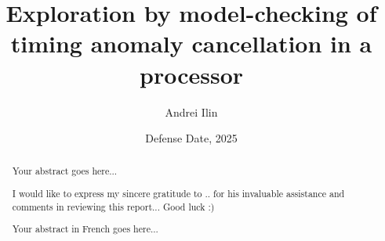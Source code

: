 \documentclass[12pt, a4paper]{memoir} %
\title{Exploration by model-checking of timing anomaly cancellation in a processor} %
\author{Andrei Ilin}
\date{Defense Date, 2025} %
\begin{document}
\frontmatter
\begin{titlingpage}
\maketitle
\end{titlingpage}

\setlength{\parskip}{-1pt plus 1pt}

\renewcommand{\abstracttextfont}{\normalfont}
\abstractintoc
\begin{abstract} 
Your abstract goes here... 
\end{abstract}
\abstractintoc

\renewcommand\abstractname{Acknowledgement}
\begin{abstract}
I would like to express my sincere gratitude to .. for his invaluable assistance and comments in reviewing this report... 
Good luck :) 
\end{abstract}


\renewcommand\abstractname{R\'esum\'e}
\begin{abstract} 
Your abstract in French goes here... 
\end{abstract}

\cleardoublepage

\tableofcontents* %
\normalsize

\mainmatter
\SingleSpace







\backmatter





\end{document}
